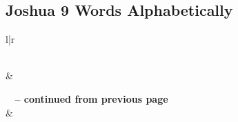 

\subsection{Joshua 9 Words Alphabetically}


\normalsize
 
\begin{center}
\begin{longtable}{l|r}
\caption[Joshua 9 Words Alphabetically]{Joshua 9 Words Alphabetically}\label{table:WordsAlphabetically for Joshua 9} \\
\hline {} &  \\ \hline 
\endfirsthead
 
{{\bfseries \tablename\ \thetable{} -- continued from previous page}} \\  
\hline {} &  \\ \hline 
\endhead
 

\end{longtable}
\end{center}
